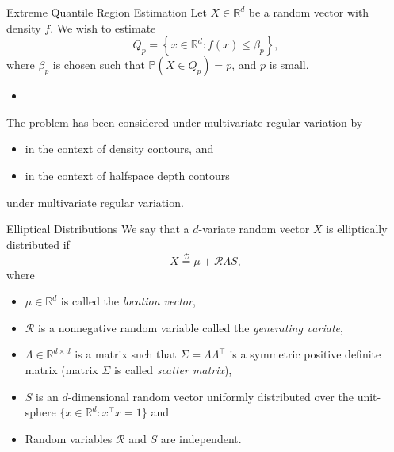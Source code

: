 \documentclass{beamer}
\begin{document}
\begin{frame}{Extreme Quantile Region Estimation}
  Let $X\in\mathbb{R}^d$ be a random vector with density $f$. We wish to
  estimate
  \begin{equation*}
    Q_p = \left\{x\in\mathbb{R}^d : f(x)\leq \beta_p\right\},
  \end{equation*}
  where $\beta_p$ is chosen such that $\mathbb{P}\left(X\in Q_p\right) = p$, and
  $p$ is small.
  \pause
  \begin{itemize}
    \item[]
  \end{itemize}
  The problem has been considered under multivariate regular variation by
  \begin{itemize}
    \item \cite{cai2011} in the context of density contours, and 
    \item \cite{he2017} in the context of halfspace depth contours
  \end{itemize}
  under multivariate regular variation. 
\end{frame}


\begin{frame}{Elliptical Distributions \parencite{cambanis1981}} We say that a
  $d$-variate random vector $X$ is elliptically distributed if
  \begin{equation*}
    X \stackrel{\mathcal{D}}{=} \mu + \mathcal{R} \Lambda  S,
  \end{equation*}
  where
  \begin{itemize}
    \item $\mu\in\mathbb{R}^d$ is called the \emph{location vector},
    \item $\mathcal{R}$ is a nonnegative random variable called the
    \emph{generating variate},
    \item $\Lambda \in \mathbb{R}^{d\times d}$ is a matrix such that $\Sigma =
    \Lambda \Lambda^\intercal$ is a symmetric positive definite matrix (matrix
    $\Sigma$ is called \emph{scatter matrix}),
    \item $S$ is an $d$-dimensional random vector uniformly distributed over the
    unit-sphere $\{x\in\mathbb{R}^d: x^\intercal x = 1\}$ and
    \item Random variables $\mathcal{R}$ and $S$ are independent.
  \end{itemize}
\end{frame}

\end{document}
